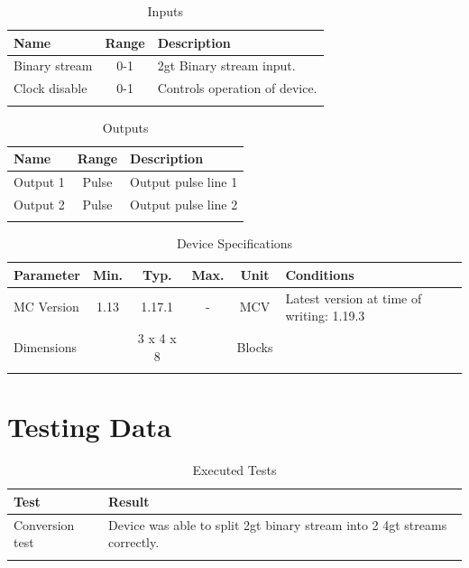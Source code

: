 \documentclass[10pt]{datasheet}
\begin{document}
\begin{table}[h]
    \caption{Inputs}
    \begin{tabularx}{\textwidth}{l | c | X}
        \thickhline
        \textbf{Name} & \textbf{Range} & \textbf{Description} \\
        \hline
        Binary stream & 0-1 & 2gt Binary stream input. \\
        \hline
        Clock disable & 0-1 & Controls operation of device. \\
        \thickhline
\end{tabularx}
\end{table}

\begin{table}[h]
    \caption{Outputs}
    \begin{tabularx}{\textwidth}{l | c | X}
        \thickhline
        \textbf{Name} & \textbf{Range} & \textbf{Description} \\
        \hline
        Output 1 & Pulse & Output pulse line 1 \\
        Output 2 & Pulse & Output pulse line 2 \\
        \thickhline
\end{tabularx}
\end{table}

\begin{table}[h]
    \caption{Device Specifications}
    \begin{tabularx}{\textwidth}{l | c c c | c | X}
        \thickhline
        \textbf{Parameter} & \textbf{Min.} & \textbf{Typ.} & \textbf{Max.} &
        \textbf{Unit} & \textbf{Conditions} \\
        \hline
        MC Version & 1.13 & 1.17.1 & - & MCV & Latest version at time of writing: 1.19.3\\
        \hline
        Dimensions & & 3 x 4 x 8 & & Blocks & \\
        \thickhline
\end{tabularx}
\end{table}
\newpage
\section{Testing Data}
\begin{table}[h]
\caption{Executed Tests}
\begin{tabularx}{\textwidth}{l | X}
    \thickhline
    \textbf{Test} & \textbf{Result} \\
    \hline
    Conversion test & Device was able to split 2gt binary stream into 2 4gt streams correctly. \\
    \thickhline
\end{tabularx}
\end{table}
\end{document}
